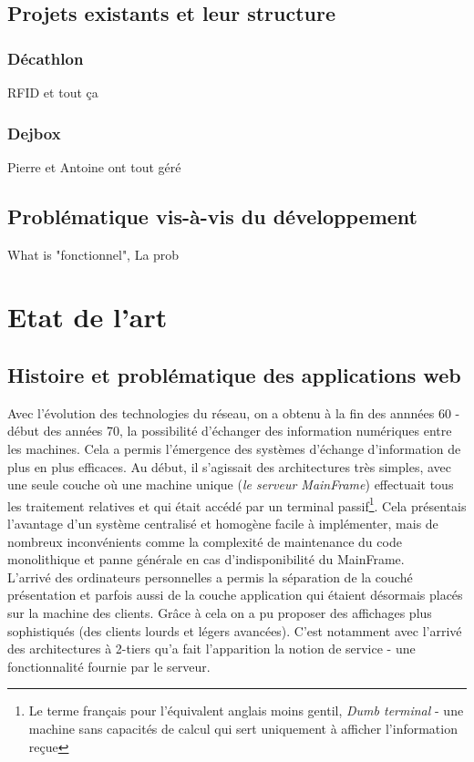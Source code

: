 \subsection{Projets existants et leur structure}
\subsubsection{Décathlon}
RFID et tout ça
\subsubsection{Dejbox}
Pierre et Antoine ont tout géré 

\subsection{Problématique vis-à-vis du développement}
What is "fonctionnel", La prob















\newpage


\section{Etat de l'art}

\subsection{Histoire et problématique des applications web}
Avec l'évolution des technologies du réseau, on a obtenu à la fin des annnées 60 - début des années 70,  la possibilité d'échanger des information numériques entre les machines. Cela a permis l'émergence des systèmes d'échange d'information de plus en plus efficaces. Au début, il s'agissait des architectures très simples, avec une seule couche où une machine unique (\emph{le serveur MainFrame}) effectuait tous les traitement relatives et qui était accédé par un terminal passif\footnote{Le terme français pour l'équivalent anglais moins gentil, \emph{Dumb terminal} - une machine sans capacités de calcul qui sert uniquement à afficher l'information reçue}. Cela présentais l'avantage d'un système centralisé et homogène facile à implémenter, mais de nombreux inconvénients comme la complexité de maintenance du code monolithique et panne générale en cas d'indisponibilité du MainFrame.  
\\
L'arrivé des ordinateurs personnelles a permis la séparation de la couché présentation et parfois aussi  de la couche application qui étaient désormais placés sur la machine des clients. Grâce à cela on a pu proposer des affichages plus sophistiqués (des clients lourds et légers avancées). C'est notamment avec l'arrivé des architectures à 2-tiers qu'a fait l'apparition la notion de service - une fonctionnalité fournie par le serveur.


